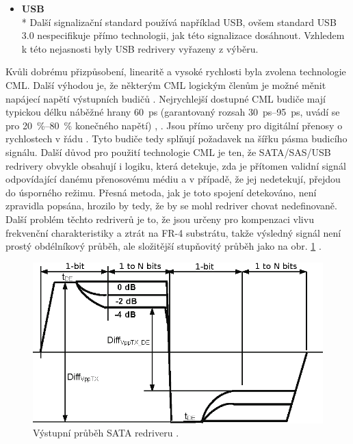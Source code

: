 \begin{itemize}
	\item
	\textbf{\acrshort{USB}}\\*
		Další signalizační standard používá například USB, ovšem standard \acrshort{USB}\,3.0 \cite{usb30standard} nespecifikuje přímo technologii, jak této signalizace dosáhnout. Vzhledem k této nejasnosti byly USB redrivery vyřazeny z výběru.
\end{itemize}

Kvůli dobrému přizpůsobení, linearitě a vysoké rychlosti byla zvolena technologie \acrshort{CML}. Další výhodou je, že některým \acrshort{CML} logickým členům je možné měnit napájecí napětí výstupních budičů \cite{SY54020datasheet}. Nejrychlejší dostupné \acrshort{CML} budiče mají typickou délku náběžné hrany \SI{60}{\pico\second} (garantovaný rozsah \mbox{\SIrange{30}{95}{\ps}}, uvádí se pro \mbox{\SIrange{20}{80}{\%}} konečného napětí) \cite{SY54020datasheet}, \cite{SY54017datasheet}. Jsou přímo určeny pro digitální přenosy o rychlostech v řádu \si{\gigabitpersecond}. Tyto budiče tedy splňují požadavek na šířku pásma budicího signálu.
Další důvod pro použití technologie \acrshort{CML} je ten, že \acrshort{SATA}/\acrshort{SAS}/\acrshort{USB} redrivery obvykle obsahují i logiku, která detekuje, zda je přítomen validní signál odpovídající danému přenosovému médiu a v případě, že jej nedetekují, přejdou do úsporného režimu. Přesná metoda, jak je toto spojení detekováno, není zpravidla popsána, hrozilo by tedy, že by se mohl redriver chovat nedefinovaně. Další problém těchto redriverů je to, že jsou určeny pro kompenzaci vlivu frekvenční charakteristiky a ztrát na FR-4 substrátu, takže výsledný signál není prostý obdélníkový průběh, ale složitější stupňovitý průběh jako na obr. \ref{redriver} \cite{SN75LVCP601datasheet}.

		\begin{figure}[htbp]\includegraphics[width=\textwidth,keepaspectratio]{images/redriver.eps}\caption{Výstupní průběh \acrshort{SATA} redriveru \cite{SN75LVCP601datasheet}.}\label{redriver}\end{figure}		
